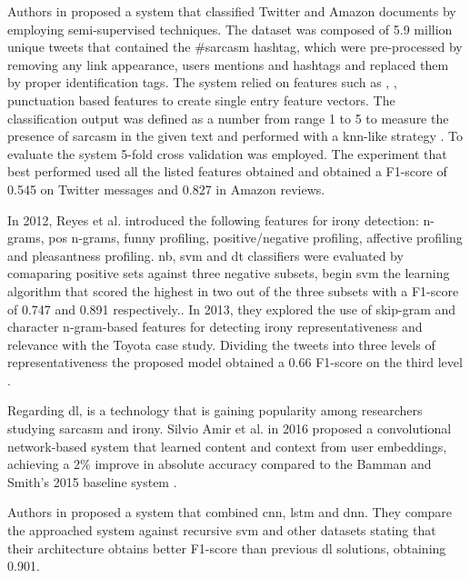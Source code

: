 Authors in \cite{davidov2010semi} proposed a system that classified Twitter and Amazon documents by employing semi-supervised techniques. The dataset was composed of 5.9 million unique tweets that contained the \#sarcasm hashtag, which were pre-processed by removing any link appearance, users mentions and hashtags and replaced them by proper identification tags. The system relied on features such as , , punctuation based features to create single entry feature vectors. The classification output was defined as a number from range 1 to 5 to measure the presence of sarcasm in the given text and performed with a \acrfull{knn}-like strategy \cite{davidov2010enhanced}. To evaluate the system 5-fold cross validation was employed. The experiment that best performed used all the listed features obtained and obtained a F1-score of 0.545 on Twitter messages and 0.827 in Amazon reviews.

In 2012, Reyes et al. introduced the following features for irony detection: n-grams, \acrfull{pos} n-grams, funny profiling, positive/negative profiling, affective profiling and pleasantness profiling. \acrshort{nb}, \acrshort{svm} and \acrfull{dt} classifiers were evaluated by comaparing positive sets against three negative subsets, begin \acrshort{svm} the learning algorithm that scored the highest in two out of the three subsets with a F1-score of 0.747 and 0.891 respectively.\cite{reyes2012making}. In 2013, they explored the use of skip-gram and character n-gram-based features for detecting irony representativeness and relevance with the Toyota case study. Dividing the tweets into three levels of representativeness the proposed model obtained a 0.66 F1-score on the third level \cite{reyes2013multidimensional}.

Regarding \acrshort{dl}, is a technology that is gaining popularity among researchers studying sarcasm and irony. Silvio Amir et al. in 2016 proposed a convolutional network-based system that learned content and context from user embeddings, achieving a 2\% improve in absolute accuracy compared to the Bamman and Smith's 2015 baseline system \cite{amir2016modelling}. 

Authors in \cite{ghosh2016fracking} proposed a system that combined \acrfull{cnn}, \acrfull{lstm} and \acrfull{dnn}. They compare the approached system against recursive \acrshort{svm} and other datasets stating that their architecture obtains better F1-score than previous \acrshort{dl} solutions, obtaining 0.901.